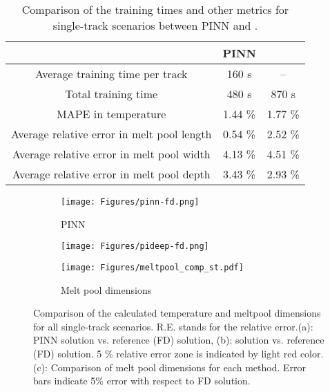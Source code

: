 \begin{table}[tb]
    \centering
    \caption{Comparison of the training times and other metrics for single-track scenarios between PINN and \pidon{}.}
    \begin{tabular}{c|c|c}
                    & PINN & \pidon{} \\
                    \hline
                    \hline
     Average training time per track  & 160 s & -- \\
     Total training time & 480 s & 870 s \\
     MAPE in temperature & 1.44 \% & 1.77 \% \\
     Average relative error in melt pool length & 0.54 \% & 2.52 \% \\
     Average relative error in melt pool width & 4.13 \% & 4.51 \% \\
     Average relative error in melt pool depth & 3.43 \% & 2.93 \% 
    \end{tabular}
    \label{tab:single-tracks}
\end{table}

\begin{figure}[p]
    \centering
    \begin{subfigure}{0.48\textwidth}
    \texttt{[image: Figures/pinn-fd.png]}
    \caption{PINN}
    \label{fig:single-tracks_pinn}
    \end{subfigure}
    \begin{subfigure}{0.48\textwidth}
    \texttt{[image: Figures/pideep-fd.png]}
    \caption{\pidon{}}
    \label{fig:single-tracks_pideep}
    \end{subfigure}
    \begin{subfigure}{0.98\textwidth}
    \texttt{[image: Figures/meltpool\_comp\_st.pdf]}
    \caption{Melt pool dimensions}
    \label{fig:single-tracks_meltpool}
    \end{subfigure}
    \caption{Comparison of the calculated temperature and meltpool dimensions for all single-track scenarios. R.E. stands for the relative error.(a): PINN solution vs. reference (FD) solution, (b): \pidon{} solution vs. reference (FD) solution. 5 \% relative error zone is indicated by light red color. (c): Comparison of melt pool dimensions for each method.  Error bars indicate 5\% error with respect to FD solution.}
    \label{fig:single-tracks}
\end{figure}